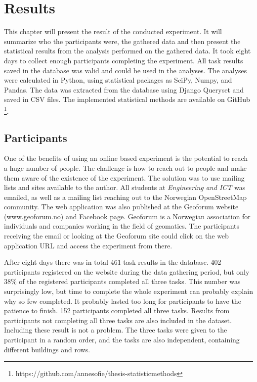 \chapter{Results}
This chapter will present the result of the conducted experiment. It will summarize who the participants were, the gathered data and then present the statistical results from the analysis performed on the gathered data. It took eight days to collect enough participants completing the experiment. All task results saved in the database was valid and could be used in the analyses. The analyses were calculated in Python, using statistical packages as SciPy, Numpy, and Pandas. The data was extracted from the database using Django Queryset and saved in CSV files. The implemented statistical methods are available on GitHub \footnote{https://github.com/annesofie/thesis-statisticmethods}. 

\section{Participants}
One of the benefits of using an online based experiment is the potential to reach a huge number of people. The challenge is how to reach out to people and make them aware of the existence of the experiment. The solution was to use mailing lists and sites available to the author. All students at \textit{Engineering and ICT} was emailed, as well as a mailing list reaching out to the Norwegian OpenStreetMap community. The web application was also published at the Geoforum website (www.geoforum.no) and Facebook page. Geoforum is a Norwegian association for individuals and companies working in the field of geomatics. The participants receiving the email or looking at the Geoforum site could click on the web application URL and access the experiment from there. 

After eight days there was in total 461 task results in the database. 402 participants registered on the website during the data gathering period, but only 38\% of the registered participants completed all three tasks. This number was surprisingly low, but time to complete the whole experiment can probably explain why so few completed. It probably lasted too long for participants to have the patience to finish. 152 participants completed all three tasks. Results from participants not completing all three tasks are also included in the dataset. Including these result is not a problem. The three tasks were given to the participant in a random order, and the tasks are also independent, containing different buildings and rows. %


